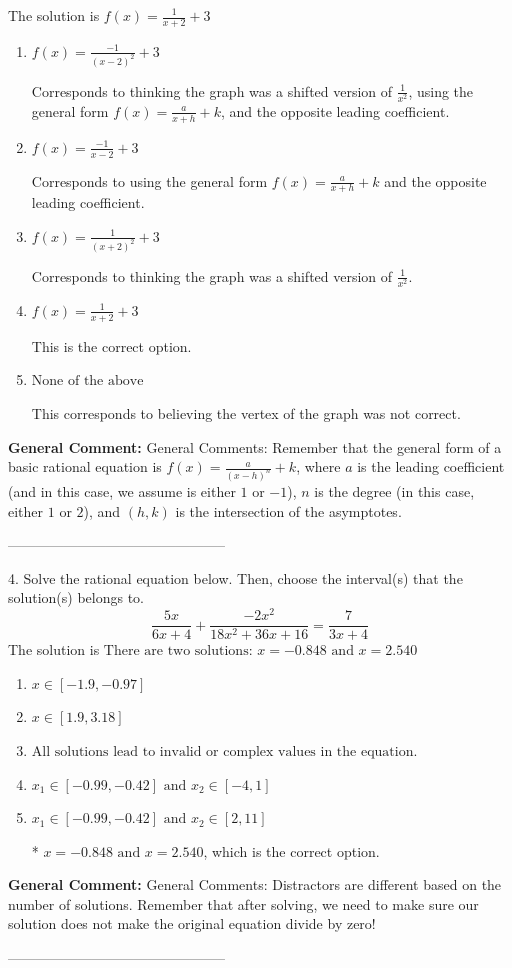 \documentclass{extbook}[14pt]
\begin{document}
The solution is $ f(x) = \frac{1}{x + 2} + 3 $ 

\begin{enumerate}[label=\Alph*.] 
\item $ f(x) = \frac{-1}{(x - 2)^2} + 3 $ 

 Corresponds to thinking the graph was a shifted version of $\frac{1}{x^2}$, using the general form $f(x) = \frac{a}{x+h}+k$, and the opposite leading coefficient. 
\item $ f(x) = \frac{-1}{x - 2} + 3 $ 

 Corresponds to using the general form $f(x) = \frac{a}{x+h}+k$ and the opposite leading coefficient. 
\item $ f(x) = \frac{1}{(x + 2)^2} + 3 $ 

 Corresponds to thinking the graph was a shifted version of $\frac{1}{x^2}$. 
\item $ f(x) = \frac{1}{x + 2} + 3 $ 

 This is the correct option. 
\item $ \text{None of the above} $ 

 This corresponds to believing the vertex of the graph was not correct. 
\end{enumerate} 
 
\textbf{General Comment:} General Comments: Remember that the general form of a basic rational equation is $ f(x) = \frac{a}{(x-h)^n} + k$, where $a$ is the leading coefficient (and in this case, we assume is either $1$ or $-1$), $n$ is the degree (in this case, either $1$ or $2$), and $(h, k)$ is the intersection of the asymptotes. 

-----------------------------------------------

4. Solve the rational equation below. Then, choose the interval(s) that the solution(s) belongs to.
\[ \frac{5x}{6x + 4} + \frac{-2x^{2}}{18x^{2} +36 x + 16} = \frac{7}{3x + 4} \] 
The solution is $ \text{There are two solutions: } x = -0.848 \text{ and } x = 2.540 $ 

\begin{enumerate}[label=\Alph*.] 
\item $ x \in [-1.9,-0.97] $ 

  
\item $ x \in [1.9,3.18] $ 

  
\item $ \text{All solutions lead to invalid or complex values in the equation.} $ 

  
\item $ x_1 \in [-0.99, -0.42] \text{ and } x_2 \in [-4,1] $ 

  
\item $ x_1 \in [-0.99, -0.42] \text{ and } x_2 \in [2,11] $ 

 * $x = -0.848 \text{ and } x = 2.540$, which is the correct option. 
\end{enumerate} 
 
\textbf{General Comment:} General Comments: Distractors are different based on the number of solutions. Remember that after solving, we need to make sure our solution does not make the original equation divide by zero! 

-----------------------------------------------
\end{document}
